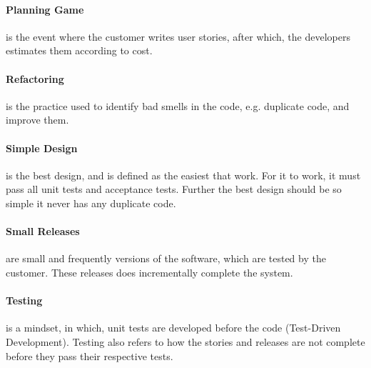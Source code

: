 \paragraph{Planning Game} is the event where the customer writes user stories, after which, the developers estimates them according to cost.

\paragraph{Refactoring} is the practice used to identify bad smells in the code, e.g. duplicate code, and improve them.

\paragraph{Simple Design} is the best design, and is defined as the easiest that work.
For it to work, it must pass all unit tests and acceptance tests.
Further the best design should be so simple it never has any duplicate code.


\paragraph{Small Releases} are small and frequently versions of the software, which are tested by the customer.
These releases does incrementally complete the system.

\paragraph{Testing} is a mindset, in which, unit tests are developed before the code (Test-Driven Development).
Testing also refers to how the stories and releases are not complete before they pass their respective tests.

